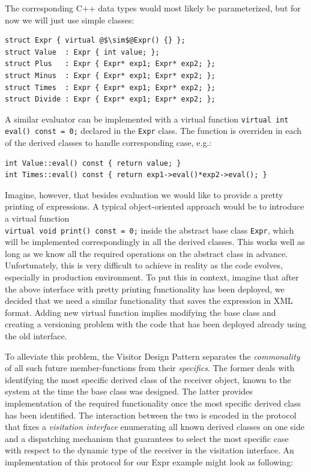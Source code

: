 \documentclass[preprint]{sigplanconf}
\makeatletter
\DeclareRobustCommand{\code}[1]{{\lstinline[breaklines=false,escapechar=@]{#1}}}
\makeatother
\begin{document}
The corresponding C++ data types would most likely be parameterized, but for
now we will just use simple classes:

\begin{lstlisting}[keepspaces,columns=flexible]
struct Expr { virtual @$\sim$@Expr() {} };
struct Value  : Expr { int value; };
struct Plus   : Expr { Expr* exp1; Expr* exp2; };
struct Minus  : Expr { Expr* exp1; Expr* exp2; };
struct Times  : Expr { Expr* exp1; Expr* exp2; };
struct Divide : Expr { Expr* exp1; Expr* exp2; };
\end{lstlisting}

A similar evaluator can be implemented with a virtual function \code{virtual int 
eval() const = 0;} declared in the \code{Expr} class. The function is overriden 
in each of the derived classes to handle corresponding case, e.g.:

\begin{lstlisting}[keepspaces,columns=flexible]
int Value::eval() const { return value; }
int Times::eval() const { return exp1->eval()*exp2->eval(); }
\end{lstlisting}

Imagine, however, that besides evaluation we would like to provide a pretty 
printing of expressions. A typical object-oriented approach would be to 
introduce a virtual function \\ \code{virtual void print() const = 0;} inside 
the abstract base class \code{Expr}, which will be implemented correspondingly 
in all the derived classes. This works well as long as we know all the required  
operations on the abstract class in advance. Unfortunately, this is very 
difficult to achieve in reality as the code evolves, especially in production 
environment. To put this in context, imagine that after the above interface with 
pretty printing functionality has been deployed, we decided that we need a 
similar functionality that saves the expression in XML format. Adding new 
virtual function implies modifying the base class and creating a versioning 
problem with the code that has been deployed already using the old interface.

To alleviate this problem, the Visitor Design Pattern separates the 
\emph{commonality} of all such future member-functions from their 
\emph{specifics}. The former deals with identifying the most specific derived 
class of the receiver object, known to the system at the time the base class was 
designed. The latter provides implementation of the required functionality once 
the most specific derived class has been identified. The interaction between the 
two is encoded in the protocol that fixes a \emph{visitation interface} 
enumerating all known derived classes on one side and a dispatching mechanism 
that guarantees to select the most specific case with respect to the dynamic 
type of the receiver in the visitation interface. An implementation of this 
protocol for our Expr example might look as following:
\end{document}

